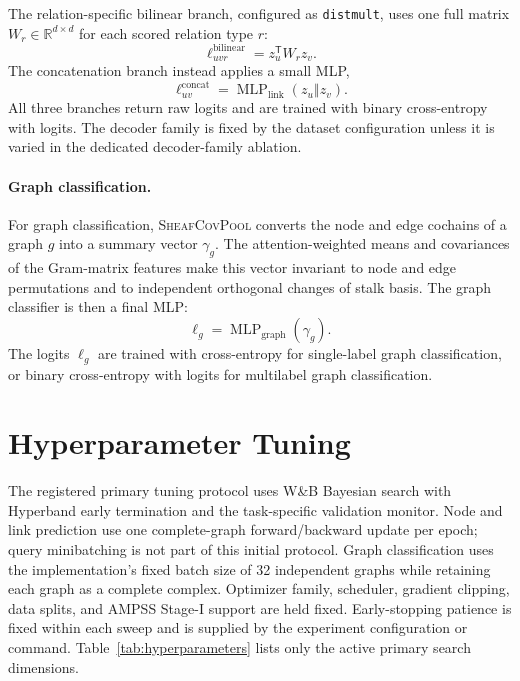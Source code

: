 \documentclass[sigconf,anonymous,review]{acmart}
\newcommand{\R}{\mathbb{R}}
\newcommand{\sheafcovpool}{\textsc{SheafCovPool}}
\newcommand{\transpose}{\mathsf{T}}
\newcommand{\concat}{\mathbin\Vert}
\begin{document}
The relation-specific bilinear branch, configured as \texttt{distmult}, uses one
full matrix \(W_r\in\R^{d\times d}\) for each scored relation type \(r\):
\begin{equation}
  \ell_{uvr}^{\mathrm{bilinear}}
  =
  z_u^{\transpose}W_r z_v .
  \label{eq:link-bilinear}
\end{equation}
The concatenation branch instead applies a small MLP,
\begin{equation}
  \ell_{uv}^{\mathrm{concat}}
  =
  \operatorname{MLP}_{\mathrm{link}}(z_u\concat z_v).
  \label{eq:link-concat}
\end{equation}
All three branches return raw logits and are trained with binary cross-entropy
with logits. The decoder family is fixed by the dataset configuration unless it
is varied in the dedicated decoder-family ablation.

\paragraph{Graph classification.}
For graph classification, \sheafcovpool{} converts the node and edge cochains of a graph
\(g\) into a summary vector \(\gamma_g\). The attention-weighted means and covariances of the
Gram-matrix features make this vector invariant to node and edge permutations and to independent
orthogonal changes of stalk basis. The graph classifier is then a final MLP:
\begin{equation}
  \ell_g
  =
  \operatorname{MLP}_{\mathrm{graph}}(\gamma_g).
  \label{eq:graph-readout}
\end{equation}
The logits \(\ell_g\) are trained with cross-entropy for single-label graph classification, or
binary cross-entropy with logits for multilabel graph classification.

\section{Hyperparameter Tuning}

The registered primary tuning protocol uses W\&B Bayesian search with Hyperband early
termination and the task-specific validation monitor. Node and link prediction use one
complete-graph forward/backward update per epoch; query minibatching is not part of this
initial protocol. Graph classification uses the implementation's fixed batch size of 32
independent graphs while retaining each graph as a complete complex. Optimizer family, scheduler,
gradient clipping, data splits, and AMPSS Stage-I support are held fixed. Early-stopping
patience is fixed within each sweep and is supplied by the experiment configuration or command.
Table~\ref{tab:hyperparameters} lists only the active primary search dimensions.
\end{document}
